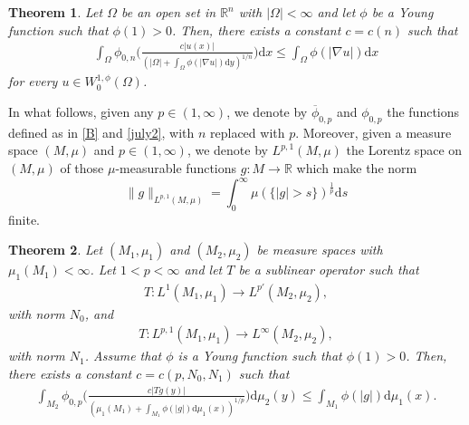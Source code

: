 \documentclass[leqno,11pt]{amsart}%
\numberwithin{equation}{section}
\def\Rn{{\mathbb R}^{n}}
\def\rn{\Rn}
\def\d{\mathrm{d}}
\def\Om{\Omega}
\newtheorem{thm}{Theorem}[section]
\theoremstyle{definition}
\numberwithin{equation}{section}
\begin{document}
\begin{thm}
    \label{SPnew}
    Let $\Omega$ be an open set in $\rn$ with $|\Omega|<\infty$ and let $\phi$ be a Young function such that $\phi(1)>0$. Then, there exists a constant $c=c(n)$ such that
    \begin{align}
        \label{SPnew1}
        \int_\Om   \phi_{0,n}\Bigg(\frac{c|u(x)|}{(|\Omega|+ \int_\Omega \phi(|\nabla u|)\d y)^{1/n}}\Bigg)\d x \leq \int_\Omega \phi(|\nabla u|)\d x
    \end{align}
    for every $u \in W^{1,\phi}_0(\Omega)$.
\end{thm}
In what follows, given any $p\in (1,\infty)$,  we denote by $\overline \phi_{0,p}$ and ${\phi}_{0,p}$ the functions defined as in \eqref{B} and \eqref{july2}, with $n$ replaced with $p$. Moreover, given a measure space $(M,\mu)$ and $p\in (1, \infty)$, we denote by $L^{p,1}(M, \mu)$ the Lorentz space on $(M,\mu)$ of those $\mu$-measurable functions $g : M \to \mathbb R$ which make the norm
$$\|g\|_{L^{p,1}(M, \mu)}= \int_0^\infty \mu(\{|g|>s\})^{\frac 1p}\d s$$
finite.
\begin{thm}
    \label{interpolation}
    Let $(M_1, \mu_1)$ and $(M_2, \mu_2)$ be measure spaces with $\mu_1(M_1)<\infty$. Let   $1<p<\infty$ and let $T$ be a sublinear operator such that
    \begin{align}
        \label{inter1}
        T: L^{1}(M_1, \mu_1) \to L^{p'}(M_2,\mu_2),
    \end{align}
    with norm $N_0$, 
    and
    \begin{align}
        \label{inter2}
        T: L^{p,1}(M_1, \mu_1) \to L^{\infty}(M_2,\mu_2),
    \end{align}
    with norm $N_1$. Assume that $\phi$ is a Young function such that $\phi(1)>0$.
    Then, there exists a constant $c=c(p, N_0, N_1)$ such that
    \begin{align}
        \label{inter3}
        \int_{M_2}  \phi_{0,p}\Bigg(\frac{c|Tg(y)|}{(\mu_1(M_1)+ \int_{M_1} \phi(|g|)\d \mu_1(x))^{1/p}}\Bigg)\d \mu_2(y) \leq \int_{M_1} \phi(|g|)\d \mu_1(x).
    \end{align}
\end{thm}
\end{document}
